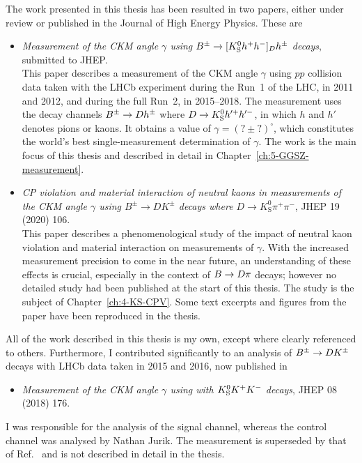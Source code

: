 The work presented in this thesis has been resulted in two papers, either under review or published in the Journal of High Energy Physics. These are
\begin{itemize}

    \item [] \cite{GGSZ-B2Dh} \emph{Measurement of the CKM angle $\gamma$ using ${{B}^\pm}\rightarrow [{{K}^0_{\mathrm{S}}} h^+h^-]_{D} h^\pm$ decays}, submitted to JHEP. \\
    This paper describes a measurement of the CKM angle $\gamma$ using $pp$ collision data taken with the LHCb experiment during the Run~1 of the LHC, in 2011 and 2012, and during the full Run~2, in 2015--2018. The measurement uses the decay channels ${{B}^\pm}\rightarrow{\ensuremath{D}} h^\pm$ where ${D}\rightarrow{\ensuremath{{K}^0_{\mathrm{S}}}} h'^+h'^-$, in which $h$ and $h'$ denotes pions or kaons. It obtains a value of $\gamma = (?\pm?)^\circ$, which constitutes the world's best single-measurement determination of $\gamma$. The work is the main focus of this thesis and described in detail in Chapter~\ref{ch:5-GGSZ-measurement}.

    \item [] \cite{KsCPV} \emph{CP violation and material interaction of neutral kaons
                        in measurements of the CKM angle $\gamma$ using $B^\pm\to
                        DK^\pm$ decays where $D\to K_\text{S}^0\pi^+\pi^-$}, JHEP 19 (2020) 106. \\
                        This paper describes a phenomenological study of the impact of neutral kaon \CP violation and material interaction on measurements of $\gamma$. With the increased measurement precision to come in the near future, an understanding of these effects is crucial, especially in the context of ${B}\rightarrow{\ensuremath{D}}\pi$ decays; however no detailed study had been published at the start of this thesis. The study is the subject of Chapter~\ref{ch:4-KS-CPV}. Some text excerpts and figures from the paper have been reproduced in the thesis.
\end{itemize}
All of the work described in this thesis is my own, except where clearly referenced to others. Furthermore, I contributed significantly to an analysis of ${{B}^\pm}\rightarrow{\ensuremath{D}}{\ensuremath{{K}^\pm}}$ decays with LHCb data taken in 2015 and 2016, now published in
\begin{itemize}
    \item [] \cite{LHCb-PAPER-2018-017} \emph{Measurement of the CKM angle $\gamma$ using  with  ${{K}^0_{\mathrm{S}}} K^+K^-$ decays}, JHEP 08 (2018) 176.
\end{itemize}
I was responsible for the analysis of the signal channel, whereas the control channel was analysed by Nathan Jurik. The measurement is superseded by that of Ref.~\cite{GGSZ-B2Dh} and is not described in detail in the thesis.